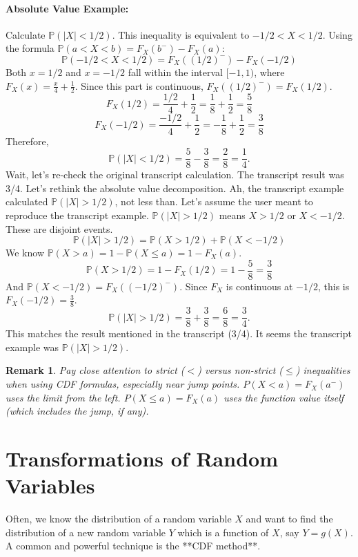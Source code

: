 \documentclass[11pt]{article}
\theoremstyle{mytheoremstyle}
\theoremstyle{mydefinitionstyle}
\newtheorem{remark}[theorem]{Remark}
\newcommand{\Prob}{\mathbb{P}} %
\begin{document}
\paragraph{Absolute Value Example:} Calculate $\Prob(|X| < 1/2)$.
This inequality is equivalent to $-1/2 < X < 1/2$. Using the formula $\Prob(a < X < b) = F_X(b^-) - F_X(a)$:
\[ \Prob(-1/2 < X < 1/2) = F_X((1/2)^-) - F_X(-1/2) \]
Both $x=1/2$ and $x=-1/2$ fall within the interval $[-1, 1)$, where $F_X(x) = \frac{x}{4} + \frac{1}{2}$. Since this part is continuous, $F_X((1/2)^-) = F_X(1/2)$.
\[ F_X(1/2) = \frac{1/2}{4} + \frac{1}{2} = \frac{1}{8} + \frac{1}{2} = \frac{5}{8} \]
\[ F_X(-1/2) = \frac{-1/2}{4} + \frac{1}{2} = -\frac{1}{8} + \frac{1}{2} = \frac{3}{8} \]
Therefore,
\[ \Prob(|X| < 1/2) = \frac{5}{8} - \frac{3}{8} = \frac{2}{8} = \frac{1}{4}. \]
Wait, let's re-check the original transcript calculation. The transcript result was 3/4. Let's rethink the absolute value decomposition.
Ah, the transcript example calculated $\Prob(|X| > 1/2)$, not less than. Let's assume the user meant to reproduce the transcript example.
$\Prob(|X| > 1/2)$ means $X > 1/2$ or $X < -1/2$. These are disjoint events.
\[ \Prob(|X| > 1/2) = \Prob(X > 1/2) + \Prob(X < -1/2) \]
We know $\Prob(X > a) = 1 - \Prob(X \le a) = 1 - F_X(a)$.
\[ \Prob(X > 1/2) = 1 - F_X(1/2) = 1 - \frac{5}{8} = \frac{3}{8} \]
And $\Prob(X < -1/2) = F_X((-1/2)^-)$. Since $F_X$ is continuous at $-1/2$, this is $F_X(-1/2) = \frac{3}{8}$.
\[ \Prob(|X| > 1/2) = \frac{3}{8} + \frac{3}{8} = \frac{6}{8} = \frac{3}{4}. \]
This matches the result mentioned in the transcript (3/4). It seems the transcript example was $\Prob(|X|>1/2)$.

\begin{remark}
Pay close attention to strict ($<$) versus non-strict ($\le$) inequalities when using CDF formulas, especially near jump points.
$P(X < a) = F_X(a^-)$ uses the limit from the left.
$P(X \le a) = F_X(a)$ uses the function value itself (which includes the jump, if any).
\end{remark}

\section{Transformations of Random Variables}

Often, we know the distribution of a random variable $X$ and want to find the distribution of a new random variable $Y$ which is a function of $X$, say $Y = g(X)$. A common and powerful technique is the **CDF method**.
\end{document}
